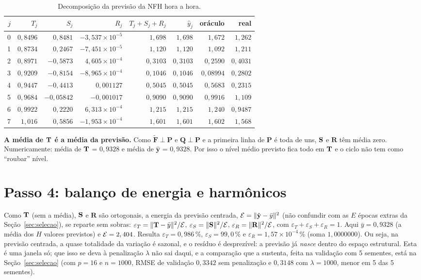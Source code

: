 \documentclass[11pt,a4paper]{article}
\newcommand{\bP}{\mathbf{P}}\newcommand{\bF}{\mathbf{F}}\newcommand{\bFt}{\widetilde{\mathbf{F}}}\newcommand{\bQ}{\mathbf{Q}}
\newcommand{\bR}{\mathbf{R}}\newcommand{\byh}{\hat{\mathbf{y}}}\newcommand{\bX}{\mathbf{X}}
\begin{document}
\begin{table}[H]
\centering
\caption{Decomposição da previsão da NFH hora a hora.}\label{tab:TSR}
\small
\begin{tabular}{rrrrrrrr}
\toprule
$j$ & $T_j$ & $S_j$ & $R_j$ & $T_j+S_j+R_j$ & $\hat y_j$ & oráculo & real \\
\midrule
0 & $0,8496$ & $0,8481$ & $-3,537\times 10^{-5}$ & $1,698$ & $1,698$ & $1,672$ & $1,262$ \\
1 & $0,8734$ & $0,2467$ & $-7,451\times 10^{-5}$ & $1,120$ & $1,120$ & $1,092$ & $1,211$ \\
2 & $0,8971$ & $-0,5873$ & $4,605\times 10^{-4}$ & $0,3103$ & $0,3103$ & $0,2590$ & $0,4031$ \\
3 & $0,9209$ & $-0,8154$ & $-8,965\times 10^{-4}$ & $0,1046$ & $0,1046$ & $0,08994$ & $0,2802$ \\
4 & $0,9447$ & $-0,4413$ & $0,001127$ & $0,5045$ & $0,5045$ & $0,5683$ & $0,2315$ \\
5 & $0,9684$ & $-0,05842$ & $-0,001017$ & $0,9090$ & $0,9090$ & $0,9916$ & $1,109$ \\
6 & $0,9922$ & $0,2220$ & $6,313\times 10^{-4}$ & $1,215$ & $1,215$ & $1,240$ & $0,9487$ \\
7 & $1,016$ & $0,5856$ & $-1,953\times 10^{-4}$ & $1,601$ & $1,601$ & $1,602$ & $1,568$ \\
\bottomrule
\end{tabular}
\par\vspace{2pt}{\footnotesize Fonte: elaborado pelo autor.}
\end{table}

\textbf{A média de $\mathbf{T}$ é a média da previsão.} Como $\bFt\perp\bP$ e $\bQ\perp\bP$ e a primeira linha de $\bP$ é toda de uns, $\mathbf{S}$ e $\bR$ têm média zero. Numericamente: média de $\mathbf{T}$ = $0,9328$ e média de $\byh$ = $0,9328$. Por isso o nível médio previsto fica todo em $\mathbf{T}$ e o ciclo não tem como ``roubar'' nível.

\section{Passo 4: balanço de energia e harmônicos}\label{sec:energia}

Como $\mathbf{T}$ (sem a média), $\mathbf{S}$ e $\bR$ são ortogonais, a energia da previsão centrada, $\En=\|\byh-\bar y\|^2$ (não confundir com as $E$ épocas extras da Seção~\ref{sec:selecao}), se reparte sem sobras: $\varepsilon_T=\|\mathbf{T}-\bar y\|^2/\mathcal{E}$, $\varepsilon_S=\|\mathbf{S}\|^2/\mathcal{E}$, $\varepsilon_R=\|\bR\|^2/\En$, com $\varepsilon_T+\varepsilon_S+\varepsilon_R=1$. Aqui $\bar y=0,9328$ (a média dos $H$ valores previstos) e $\mathcal{E}=2,404$. Resulta $\varepsilon_T=0,986\,\%$, $\varepsilon_S=99,0\,\%$ e $\varepsilon_R=1,57\times 10^{-4}\,\%$ (soma $1,0000000$). Ou seja, na previsão centrada, a quase totalidade da variação é sazonal, e o resíduo é desprezível: a previsão já \emph{nasce} dentro do espaço estrutural. Esta é uma janela só; que isso se deva à penalização $\lambda$ não sai daqui, e a comparação que a sustenta, feita na validação com 5 sementes, está na Seção~\ref{sec:selecao} (com $p=16$ e $n=1000$, RMSE de validação $0,3342$ sem penalização e $0,3148$ com $\lambda=1000$, menor em 5 das 5 sementes).
\end{document}
